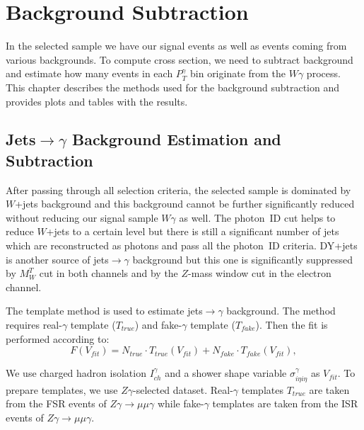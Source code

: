 \section{Background Subtraction}
\label{sec:BackgroundSubtraction}

In the selected sample we have our signal events as well as events coming from various backgrounds. To compute cross section, we need to subtract background and estimate how many events in each $P_T^\gamma$ bin originate from the $W\gamma$ process. This chapter describes the methods used for the background subtraction and provides plots and tables with the results.

\subsection{Jets$\rightarrow\gamma$ Background Estimation and Subtraction}
\label{sec:BackgroundSubtraction_jtog}

After passing through all selection criteria, the selected sample is dominated by $W$+jets background and this background cannot be further significantly reduced without reducing our signal sample $W\gamma$ as well. The photon~ID cut helps to reduce $W$+jets to a certain level but there is still a significant number of jets which are reconstructed as photons and pass all the photon~ID criteria. DY+jets is another source of jets$\rightarrow \gamma$ background but this one is significantly suppressed by $M_W^T$ cut in both channels and by the $Z$-mass window cut in the electron channel.

The template method is used to estimate jets$ \rightarrow \gamma$ background. The method requires real-$\gamma$ template ($T_{true}$) and fake-$\gamma$ template ($T_{fake}$). Then the fit is performed according to: 
\begin{equation}
F(V_{fit})=N_{true} \cdot T_{true}(V_{fit}) + N_{fake} \cdot T_{fake}(V_{fit}),
\end{equation}

We use charged hadron isolation $I_{ch}^{\gamma}$ and a shower shape variable $\sigma_{i\eta i\eta}^{\gamma}$ as $V_{fit}$. To prepare templates, we use $Z\gamma$-selected dataset. Real-$\gamma$ templates $T_{true}$ are taken from the FSR events of $Z\gamma\rightarrow\mu\mu\gamma$ while fake-$\gamma$ templates are taken from the ISR events of $Z\gamma\rightarrow\mu\mu\gamma$.

